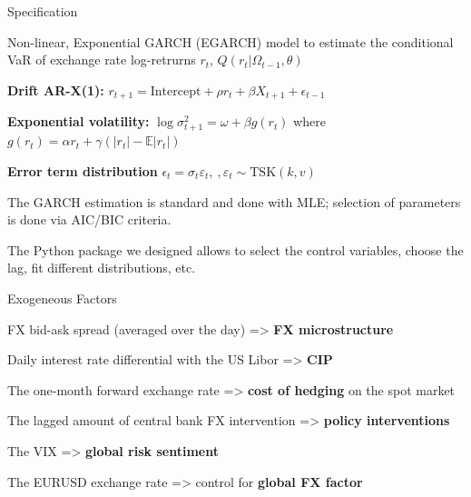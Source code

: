 \documentclass{beamer}
\newenvironment{largeitemize}{\itemize\addtolength{\itemsep}{10pt}}{\enditemize}
\newenvironment{largeenumerate}{\enumerate\addtolength{\itemsep}{10pt}}{\endenumerate}
\begin{document}
\begin{frame}{Specification}
  
Non-linear, Exponential GARCH (EGARCH) model to estimate the conditional
VaR of exchange rate log-retrurns $r_t$, $Q(r_t| \Omega_{t-1}, \theta)$

\bigskip

\begin{largeitemize}
\item[] \textbf{Drift AR-X(1):} $r_{t+1} = \text{Intercept} +
  \rho r_t + \beta X_{t+1} + \epsilon_{t-1}$\\
  
\item[] \textbf{Exponential volatility:} $\log \sigma_{t+1}^{2} = \omega + \beta
g(r_t)$ where $g(r_t) = \alpha r_t + \gamma(|r_t|-\mathbb{E}|r_t|)$

\item[] \textbf{Error term distribution} $\epsilon_t = \sigma_t \varepsilon_t,
  \ , \varepsilon_t \sim \text{TSK}(k,v)$\\
\end{largeitemize}

\bigskip

\begin{largeitemize}
  \item The GARCH estimation is standard and done with MLE; selection of parameters
    is done via AIC/BIC criteria.
  \item The Python package we designed allows to select the control variables, choose
the lag, fit different distributions, etc.
\end{largeitemize}
\end{frame}

\begin{frame}{Exogeneous Factors}

  \begin{largeenumerate}
  \item FX bid-ask spread (averaged over the day) => \textbf{FX microstructure}
  \item Daily interest rate differential with the US Libor => \textbf{CIP}
  \item The one-month forward exchange rate => \textbf{cost of hedging} on the spot
    market
  \item The lagged amount of central bank FX intervention => \textbf{policy interventions}
  \item The VIX => \textbf{global risk sentiment}
  \item The EURUSD exchange rate => control for \textbf{global FX factor}
  \end{largeenumerate}
 
\end{frame}
\end{document}
